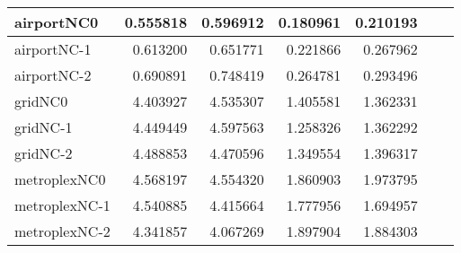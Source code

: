 \begin{longtable}{|l|r|r|r|r|r|r|}
airportNC0 & 0.555818 & 0.596912 & 0.180961 & 0.210193 \\ \hline
airportNC-1 & 0.613200 & 0.651771 & 0.221866 & 0.267962 \\ \hline
airportNC-2 & 0.690891 & 0.748419 & 0.264781 & 0.293496 \\ \hline
gridNC0 & 4.403927 & 4.535307 & 1.405581 & 1.362331 \\ \hline
gridNC-1 & 4.449449 & 4.597563 & 1.258326 & 1.362292 \\ \hline
gridNC-2 & 4.488853 & 4.470596 & 1.349554 & 1.396317 \\ \hline
metroplexNC0 & 4.568197 & 4.554320 & 1.860903 & 1.973795 \\ \hline
metroplexNC-1 & 4.540885 & 4.415664 & 1.777956 & 1.694957 \\ \hline
metroplexNC-2 & 4.341857 & 4.067269 & 1.897904 & 1.884303 \\ \hline
\end{longtable}
